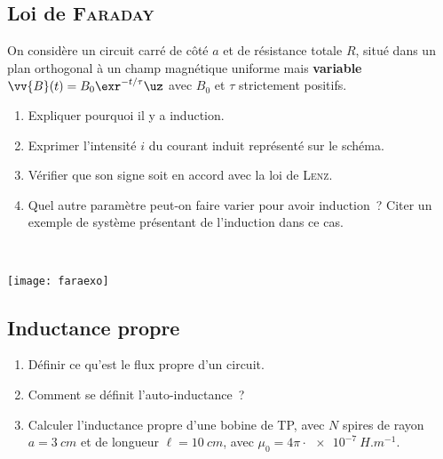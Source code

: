 \documentclass[11pt]{book}
\begin{document}
{	\subsection{Loi de \textsc{Faraday}}
	\label{ssec:faraday}
	\noindent
	\begin{minipage}[t]{.75\linewidth}
		On considère un circuit carré de côté $a$ et de résistance totale $R$, situé
		dans un plan orthogonal à un champ magnétique uniforme mais \textbf{variable}
		$\vv{B}(t) = B_0\exr^{-t/\tau}\uz$ avec $B_0$ et $\tau$ strictement positifs.
		\begin{enumerate}[start=7]
			\item Expliquer pourquoi il y a induction.
			\item Exprimer l'intensité $i$ du courant induit représenté sur le schéma.
			\item Vérifier que son signe soit en accord avec la loi de \textsc{Lenz}.
			\item Quel autre paramètre peut-on faire varier pour avoir induction~? Citer
			      un exemple de système présentant de l'induction dans ce cas.
		\end{enumerate}
	\end{minipage}
	\hfill
	\begin{minipage}[t]{.20\linewidth}
		~
		\vspace*{-20pt}
		\begin{center}
			\texttt{[image: faraexo]}
			\label{fig:faraexo}
		\end{center}
	\end{minipage}

	\subsection{Inductance propre}
	\label{ssec:indprp}
	\begin{enumerate}[start=11]
		\item Définir ce qu'est le flux propre d'un circuit.
		\item Comment se définit l'auto-inductance~?
		\item Calculer l'inductance propre d'une bobine de TP, avec $N$ spires de
		      rayon $a = \SI{3}{cm}$ et de longueur $\ell = \SI{10}{cm}$, avec $\mu_0 =
			      4\pi \cdot \SI{e-7}{H.m^{-1}}$.
	\end{enumerate}

	\newpage
}{
	\small
}
\end{document}

